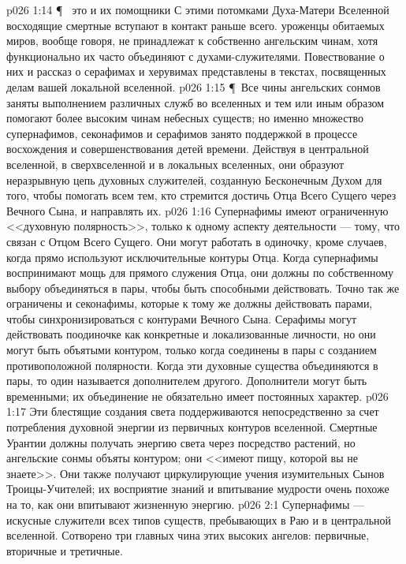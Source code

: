 \vs p026 1:14 \P\ \bibnobreakspace {} это  и их помощники  С этими потомками Духа\hyp{}Матери Вселенной восходящие смертные вступают в контакт раньше всего.  уроженцы обитаемых миров, вообще говоря, не принадлежат к собственно ангельским чинам, хотя функционально их часто объединяют с духами\hyp{}служителями. Повествование о них и рассказ о серафимах и херувимах представлены в текстах, посвященных делам вашей локальной вселенной.
\vs p026 1:15 \P\ Все чины ангельских сонмов заняты выполнением различных служб во вселенных и тем или иным образом помогают более высоким чинам небесных существ; но именно множество супернафимов, секонафимов и серафимов занято поддержкой в процессе восхождения и совершенствования детей времени. Действуя в центральной вселенной, в сверхвселенной и в локальных вселенных, они образуют неразрывную цепь духовных служителей, созданную Бесконечным Духом для того, чтобы помогать всем тем, кто стремится достичь Отца Всего Сущего через Вечного Сына, и направлять их.
\vs p026 1:16 Супернафимы имеют ограниченную <<духовную полярность>>, только к одному аспекту деятельности --- тому, что связан с Отцом Всего Сущего. Они могут работать в одиночку, кроме случаев, когда прямо используют исключительные контуры Отца. Когда супернафимы воспринимают мощь для прямого служения Отца, они должны по собственному выбору объединяться в пары, чтобы быть способными действовать. Точно так же ограничены и секонафимы, которые к тому же должны действовать парами, чтобы синхронизироваться с контурами Вечного Сына. Серафимы могут действовать поодиночке как конкретные и локализованные личности, но они могут быть объятыми контуром, только когда соединены в пары с созданием противоположной полярности. Когда эти духовные существа объединяются в пары, то один называется дополнителем другого. Дополнители могут быть временными; их объединение не обязательно имеет постоянных характер.
\vs p026 1:17 Эти блестящие создания света поддерживаются непосредственно за счет потребления духовной энергии из первичных контуров вселенной. Смертные Урантии должны получать энергию света через посредство растений, но ангельские сонмы объяты контуром; они <<имеют пищу, которой вы не знаете>>. Они также получают циркулирующие учения изумительных Сынов Троицы\hyp{}Учителей; их восприятие знаний и впитывание мудрости очень похоже на то, как они впитывают жизненную энергию.
\vs p026 2:1 Супернафимы --- искусные служители всех типов существ, пребывающих в Раю и в центральной вселенной. Сотворено три главных чина этих высоких ангелов: первичные, вторичные и третичные.

